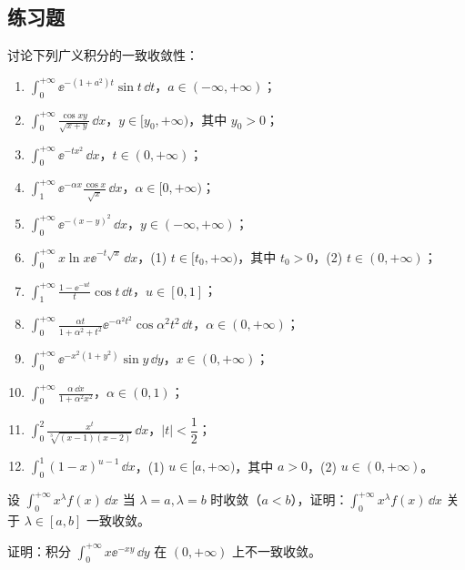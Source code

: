 \subsection{练习题}
\begin{xexercise}[1]
讨论下列广义积分的一致收敛性：
  \begin{enumerate}[label=(\arabic*)]
    \item $\displaystyle\int_0^{+\infty}\ee^{-(1+a^2)t}\sin t\,\dd t$，$a\in(-\infty,+\infty)$；
    \item $\displaystyle\int_0^{+\infty}\frac{\cos xy}{\sqrt{x+y}}\,\dd x$，$y\in[y_0,+\infty)$，其中 $y_0>0$；
    \item $\displaystyle\int_0^{+\infty}\ee^{-tx^2}\,\dd x$，$t\in(0,+\infty)$；
    \item $\displaystyle\int_1^{+\infty}\ee^{-\alpha x}\frac{\cos x}{\sqrt{x}}\,\dd x$，$\alpha\in[0,+\infty)$；
    \item $\displaystyle\int_0^{+\infty}\ee^{-(x-y)^2}\,\dd x$，$y\in(-\infty,+\infty)$；
    \item $\displaystyle\int_0^{+\infty}x\ln x\ee^{-t\sqrt{x}}\,\dd x$，(1) $t\in[t_0,+\infty)$，其中 $t_0>0$，(2) $t\in(0,+\infty)$；
    \item $\displaystyle\int_1^{+\infty}\frac{1-\ee^{-ut}}{t}\cos t\,\dd t$，$u\in[0,1]$；
    \item $\displaystyle\int_0^{+\infty}\frac{\alpha t}{1+\alpha^2+t^2}\ee^{-\alpha^2t^2}\cos\alpha^2t^2\,\dd t$，$\alpha\in(0,+\infty)$；
    \item $\displaystyle\int_0^{+\infty}\ee^{-x^2(1+y^2)}\sin y\,\dd y$，$x\in(0,+\infty)$；
    \item $\displaystyle\int_0^{+\infty}\frac{\alpha\,\dd x}{1+\alpha^2x^2}$，$\alpha\in(0,1)$；
    \item $\displaystyle\int_0^2\frac{x^t}{\sqrt[3]{(x-1)(x-2)}}\,\dd x$，$|t|<\dfrac12$；
    \item $\displaystyle\int_0^1(1-x)^{u-1}\,\dd x$，(1) $u\in[a,+\infty)$，其中 $a>0$，(2) $u\in(0,+\infty)$。
  \end{enumerate}
\end{xexercise}

\begin{xexercise}[2]
设 $\displaystyle\int_0^{+\infty}x^\lambda f(x)\,\dd x$ 当 $\lambda=a,\lambda=b$ 时收敛（$a<b$），证明：$\displaystyle\int_0^{+\infty}x^\lambda f(x)\,\dd x$ 关于 $\lambda\in[a,b]$ 一致收敛。
\end{xexercise}

\begin{xexercise}[3]
证明：积分 $\displaystyle\int_0^{+\infty}x\ee^{-xy}\,\dd y$ 在 $(0,+\infty)$ 上不一致收敛。
\end{xexercise}


